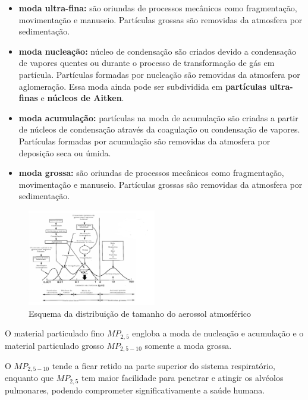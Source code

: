 \begin{itemize}
  \item \textbf{moda ultra-fina:} são oriundas de processos mecânicos como fragmentação, 
        movimentação e manuseio. Partículas grossas são removidas da atmosfera 
        por sedimentação.
  \item \textbf{moda nucleação:} núcleo de condensação são criados devido a 
        condensação de vapores quentes ou durante o processo de 
        transformação de gás em partícula. Partículas formadas por 
        nucleação são removidas da atmosfera por aglomeração. 
        Essa moda ainda pode ser subdividida em \textbf{partículas ultra-finas} e 
        \textbf{núcleos de Aitken}.  
  \item \textbf{moda acumulação:} partículas na moda de acumulação são criadas 
         a partir de núcleos de condensação através da coagulação ou 
         condensação de vapores. Partículas formadas por acumulação
         são removidas da atmosfera por deposição seca ou úmida.
  \item \textbf{moda grossa:} são oriundas de processos mecânicos como fragmentação, 
        movimentação e manuseio. Partículas grossas são removidas da atmosfera 
        por sedimentação.
\end{itemize}

\begin{figure}[H]
\begin{center}
  \includegraphics[width=0.5\textwidth]{../inputs/images/modas_aerossol.png}
  \caption{Esquema da distribuição de tamanho do aerossol atmosférico 
           \cite{finlayson1999} \label{fig:modas_aerossol}}
\end{center}
\end{figure}

O material particulado fino $MP_{2,5}$ engloba a moda de nucleação e acumulação e
o material particulado grosso $MP_{2,5-10}$ somente a moda grossa. 

O $MP_{2,5-10}$ tende a ficar retido na parte superior do sistema respiratório, 
enquanto que $MP_{2,5}$ tem maior facilidade para penetrar e atingir os alvéolos pulmonares, 
podendo comprometer significativamente a saúde humana. 

